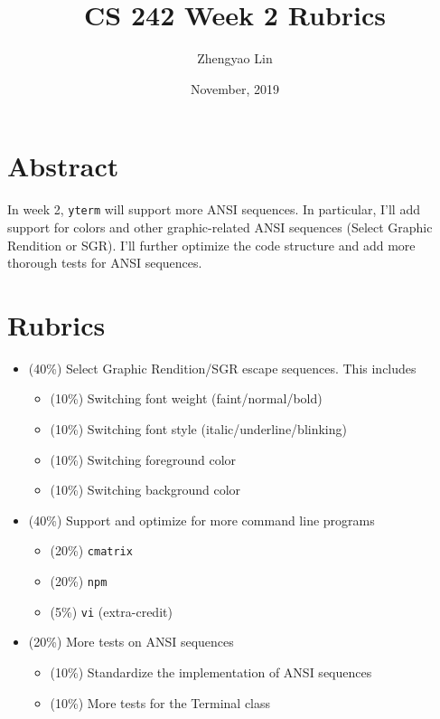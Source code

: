 \documentclass[11pt]{article}
\begin{document}
    \title{CS 242 Week 2 Rubrics}
    \author{Zhengyao Lin}
    \date{November, 2019}
    \maketitle
    
    \section{Abstract}
        In week 2, \texttt{yterm} will support more ANSI sequences. In particular, I'll add support for colors and other graphic-related ANSI sequences (Select Graphic Rendition or SGR). I'll further optimize the code structure and add more thorough tests for ANSI sequences.
    
    \section{Rubrics}
        \begin{itemize}
            \item (40\%) Select Graphic Rendition/SGR escape sequences. This includes
            \begin{itemize}
                \item (10\%) Switching font weight (faint/normal/bold)
                \item (10\%) Switching font style (italic/underline/blinking)
                \item (10\%) Switching foreground color
                \item (10\%) Switching background color
            \end{itemize}
        
            \item (40\%) Support and optimize for more command line programs
            \begin{itemize}
                \item (20\%) \texttt{cmatrix}
                \item (20\%) \texttt{npm}
                \item (5\%) \texttt{vi} (extra-credit)
            \end{itemize}
        
            \item (20\%) More tests on ANSI sequences
            \begin{itemize}
                \item (10\%) Standardize the implementation of ANSI sequences
                \item (10\%) More tests for the Terminal class
            \end{itemize}
        \end{itemize}
\end{document}
